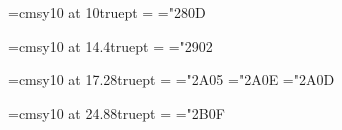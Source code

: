 %
%
%
%
\font\smallfont=cmsy10 at 10truept
=\smallfont
\mathchardef\bigCircle="280D

\font\bigfont=cmsy10 at 14.4truept
=\bigfont
\mathchardef\tiMes="2902        %

\font\Bigfont=cmsy10 at 17.28truept
=\Bigfont
\mathchardef\DiaMond="2A05        %
\mathchardef\cirCle="2A0E
\mathchardef\BigCircle="2A0D

\font\Bbigfont=cmsy10 at 24.88truept
=\Bbigfont
\mathchardef\buLLet="2B0F


\def\bigCirc{\raise 0.3ex\hbox{$\bigCircle$}\nobreak$\,$}
\def\Bigcirc{$\BigCircle$}                    %
\def\Circ{\hbox{$\cirCle$}\nobreak$\,$}
\def\Bullet{\raise-0.35ex\hbox{$\buLLet$}\nobreak$\,$}
\def\triangleup{$\bigtriangleup$\nobreak$\,$}
\def\triangledown{\raise 0.2em\hbox{$\bigtriangledown$}\nobreak$\,$}
\def\uptriangle{\triangleup}       \def\downtriangle{\triangledown}
\def\Diamond{$\DiaMond$\nobreak$\,$}

\def\minisquare{\hbox{${\vcenter{
               \hrule height 0.3pt \kern-0.4pt
               \hbox{\vrule width  0.3pt height 3.0pt \kern 2.6pt
               \vrule width  0.3pt height 3.0pt} \kern-0.4pt
               \hrule height 0.3pt}}$}}
\def\ssquare{\raise 0.175ex\hbox{${\vcenter{
               \hrule height 0.5truept       \kern-0.25truept
               \hbox{\vrule width 0.5truept height 3.0truept \kern 2.75truept
                     \vrule width 0.5truept height 3.0truept} \kern-0.25truept
               \hrule height 0.5truept}}$}\nobreak$\,$}
\def\squarex{\raise 0.175ex\hbox{${\vcenter{
               \hrule height 0.8truept       \kern-1.80truept
          \hbox{\vrule width 0.8truept height 8.0truept \kern-1.95truept
                \raise 0.8truept\hbox{$\tiMes$}     \kern-6.70truept
                \vrule width 0.8truept height 8.0truept} \kern-0.80truept
               \hrule height 0.8truept}}$}\nobreak$\,$}

